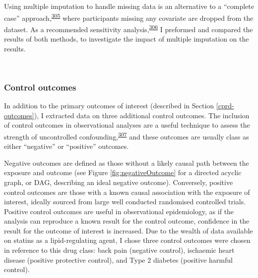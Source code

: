 \documentclass[a4paper, twoside]{templates/ociamthesis}
\begin{document}
Using multiple imputation to handle missing data is an alternative to a ``complete case'' approach,\textsuperscript{\protect\hyperlink{ref-pigott2001}{305}} where participants missing any covariate are dropped from the dataset. As a recommended sensitivity analysis,\textsuperscript{\protect\hyperlink{ref-hughes2019}{306}} I preformed and compared the results of both methods, to investigate the impact of multiple imputation on the results.

~

\hypertarget{control-outcomes}{%
\subsubsection{Control outcomes}\label{control-outcomes}}

In addition to the primary outcomes of interest (described in Section \ref{cprd-outcomes}), I extracted data on three additional control outcomes. The inclusion of control outcomes in observational analyses are a useful technique to assess the strength of uncontrolled confounding,\textsuperscript{\protect\hyperlink{ref-lipsitch2010}{307}} and these outcomes are usually class as either ``negative'' or ``positive'' outcomes.

Negative outcomes are defined as those without a likely causal path between the exposure and outcome (see Figure \ref{fig:negativeOutcome} for a directed acyclic graph, or DAG, describing an ideal negative outcome). Conversely, positive control outcomes are those with a known causal association with the exposure of interest, ideally sourced from large well conducted randomised controlled trials. Positive control outcomes are useful in observational epidemiology, as if the analysis can reproduce a known result for the control outcome, confidence in the result for the outcome of interest is increased. Due to the wealth of data available on statins as a lipid-regulating agent, I chose three control outcomes were chosen in reference to this drug class: back pain (negative control), ischaemic heart disease (positive protective control), and Type 2 diabetes (positive harmful control).

~\\
\end{document}
